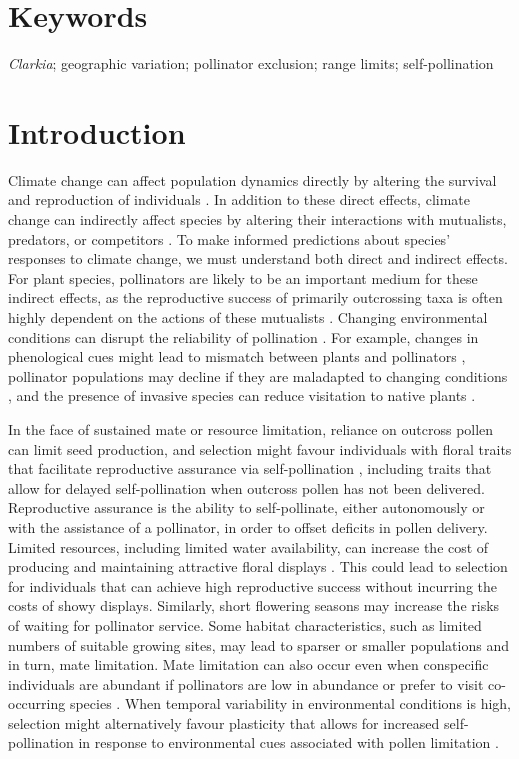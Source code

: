 \documentclass{article}
\begin{document}
\section*{Keywords}
\textit{Clarkia}; geographic variation; pollinator exclusion; range limits; self-pollination

\section*{Introduction}

Climate change can affect population dynamics directly by altering the survival and reproduction of individuals \citep{mcgraw2015northward}. In addition to these direct effects, climate change can indirectly affect species by altering their interactions with mutualists, predators, or competitors \citep{miller2015functional}. To make informed predictions about species' responses to climate change, we must understand both direct and indirect effects. For plant species, pollinators are likely to be an important medium for these indirect effects, as the reproductive success of primarily outcrossing taxa is often highly dependent on the actions of these mutualists \citep{burd1994principle, ashman2004pollen}. Changing environmental conditions can disrupt the reliability of pollination \citep{kudo2004does}. For example, changes in phenological cues might lead to mismatch between plants and pollinators \citep{kudo2013early}, pollinator populations may decline if they are maladapted to changing conditions \citep{williams2007vulnerability}, and the presence of invasive species can reduce visitation to native plants \citep{bjerknes2007alien, bruckman2016pollination}.  

In the face of sustained mate or resource limitation, reliance on outcross pollen can limit seed production, and selection might favour individuals with floral traits that facilitate reproductive assurance via self-pollination \citep{bodbyl2011rapid}, including traits that allow for delayed self-pollination when outcross pollen has not been delivered. Reproductive assurance is the ability to self-pollinate, either autonomously or with the assistance of a pollinator, in order to offset deficits in pollen delivery. Limited resources, including limited water availability, can increase the cost of producing and maintaining attractive floral displays \citep{galen1999flowers}. This could lead to selection for individuals that can achieve high reproductive success without incurring the costs of showy displays. Similarly, short flowering seasons may increase the risks of waiting for pollinator service. Some habitat characteristics, such as limited numbers of suitable growing sites, may lead to sparser or smaller populations and in turn, mate limitation. Mate limitation can also occur even when conspecific individuals are abundant if pollinators are low in abundance or prefer to visit co-occurring species \citep{knight2005pollen}. When temporal variability in environmental conditions is high, selection might alternatively favour plasticity that allows for increased self-pollination in response to environmental cues associated with pollen limitation \citep{kay2013drought}. 
\end{document}
